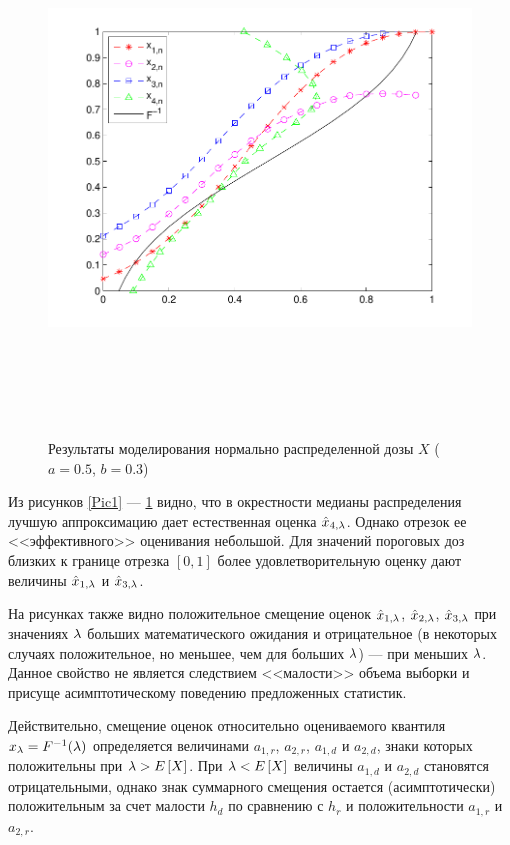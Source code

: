 \documentclass[a4paper,14pt,russian]{article}
\begin{document}
\begin{figure}[h]
\center
\caption{Результаты моделирования нормально распределенной дозы $X$ ($a=0.5$,  $b=0.3$)}\label{Pic6}
\includegraphics[width = 500pt,height = 400pt]{14.pdf}
\end{figure}
\newpage

Из рисунков \ref{Pic1} --- \ref{Pic6} видно, что в окрестности медианы распределения лучшую аппроксимацию дает естественная оценка $\hat{x}_{4,\lambda}$. Однако отрезок ее <<эффективного>> оценивания небольшой. Для значений пороговых доз близких к границе отрезка $[0,1]$ более удовлетворительную оценку дают величины $\hat{x}_{1,\lambda}$ и $\hat{x}_{3,\lambda}$.

На рисунках также видно положительное смещение оценок $\hat{x}_{1,\lambda}$, $\hat{x}_{2,\lambda}$, $\hat{x}_{3,\lambda}$ при значениях $\lambda$ больших математического ожидания и отрицательное (в некоторых случаях положительное, но меньшее, чем для больших $\lambda$) --- при меньших $\lambda$. Данное свойство не является следствием <<малости>> объема выборки и присуще асимптотическому поведению предложенных статистик.

Действительно, смещение оценок относительно оцениваемого квантиля $x_\lambda = F^{-1}(\lambda)$ определяется величинами $a_{1,r}$, $a_{2,r}$, $a_{1,d}$ и $a_{2,d}$, знаки которых положительны при $\lambda > E\left[X\right]$. При $\lambda < E\left[X\right]$ величины  $a_{1,d}$ и $a_{2,d}$ становятся отрицательными, однако знак суммарного смещения остается (асимптотически) положительным за счет малости $h_d$ по сравнению с $h_r$ и положительности $a_{1,r}$ и $a_{2,r}$.
\end{document}

